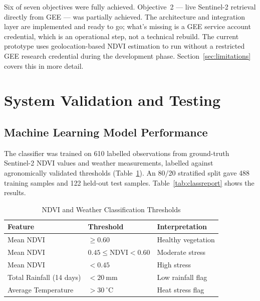Six of seven objectives were fully achieved. Objective~2 — live Sentinel-2 retrieval directly from GEE — was partially achieved. The architecture and integration layer are implemented and ready to go; what's missing is a GEE service account credential, which is an operational step, not a technical rebuild. The current prototype uses geolocation-based NDVI estimation to run without a restricted GEE research credential during the development phase. Section~\ref{sec:limitations} covers this in more detail.

\section{System Validation and Testing}

\subsection{Machine Learning Model Performance}

The classifier was trained on 610 labelled observations from ground-truth Sentinel-2 NDVI values and weather measurements, labelled against agronomically validated thresholds (Table~\ref{tab:thresholds}). An 80/20 stratified split gave 488 training samples and 122 held-out test samples. Table~\ref{tab:classreport} shows the results.

\begin{table}[H]
  \centering
  \caption{NDVI and Weather Classification Thresholds}
  \label{tab:thresholds}
  \begin{tabularx}{\textwidth}{X l l}
    \toprule
    \textbf{Feature} & \textbf{Threshold} & \textbf{Interpretation} \\
    \midrule
    Mean NDVI & $\geq 0.60$ & Healthy vegetation \\
    Mean NDVI & $0.45 \leq \text{NDVI} < 0.60$ & Moderate stress \\
    Mean NDVI & $< 0.45$ & High stress \\
    Total Rainfall (14 days) & $< 20\ \text{mm}$ & Low rainfall flag \\
    Average Temperature & $> 30\ ^{\circ}\text{C}$ & Heat stress flag \\
    \bottomrule
  \end{tabularx}
\end{table}

